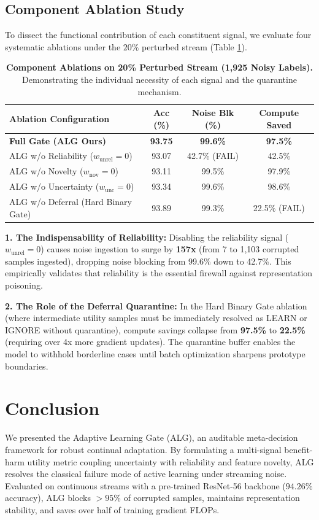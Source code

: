 \documentclass[journal,10pt,twocolumn]{article}
\begin{document}
\subsection{Component Ablation Study}
To dissect the functional contribution of each constituent signal, we evaluate four systematic ablations under the $20\%$ perturbed stream (Table \ref{tab:ablation_table}).

\begin{table}[h]
\centering
\small
\caption{\textbf{Component Ablations on 20\% Perturbed Stream (1,925 Noisy Labels).} Demonstrating the individual necessity of each signal and the quarantine mechanism.}
\label{tab:ablation_table}
\begin{tabular}{l|c|c|c}
\toprule
\textbf{Ablation Configuration} & \textbf{Acc (\%)} & \textbf{Noise Blk (\%)} & \textbf{Compute Saved} \\
\midrule
\textbf{Full Gate (ALG Ours)} & \textbf{93.75} & \textbf{99.6\%} & \textbf{97.5\%} \\
ALG w/o Reliability ($w_{\text{unrel}}=0$) & 93.07 & 42.7\% (FAIL) & 42.5\% \\
ALG w/o Novelty ($w_{\text{nov}}=0$) & 93.11 & 99.5\% & 97.9\% \\
ALG w/o Uncertainty ($w_{\text{unc}}=0$) & 93.34 & 99.6\% & 98.6\% \\
ALG w/o Deferral (Hard Binary Gate) & 93.89 & 99.3\% & 22.5\% (FAIL) \\
\bottomrule
\end{tabular}
\end{table}

\textbf{1. The Indispensability of Reliability:} Disabling the reliability signal ($w_{\text{unrel}} = 0$) causes noise ingestion to surge by \textbf{157x} (from 7 to 1,103 corrupted samples ingested), dropping noise blocking from 99.6\% down to 42.7\%. This empirically validates that reliability is the essential firewall against representation poisoning.

\textbf{2. The Role of the Deferral Quarantine:} In the Hard Binary Gate ablation (where intermediate utility samples must be immediately resolved as LEARN or IGNORE without quarantine), compute savings collapse from \textbf{97.5\%} to \textbf{22.5\%} (requiring over 4x more gradient updates). The quarantine buffer enables the model to withhold borderline cases until batch optimization sharpens prototype boundaries.

\section{Conclusion}
We presented the Adaptive Learning Gate (ALG), an auditable meta-decision framework for robust continual adaptation. By formulating a multi-signal benefit-harm utility metric coupling uncertainty with reliability and feature novelty, ALG resolves the classical failure mode of active learning under streaming noise. Evaluated on continuous streams with a pre-trained ResNet-56 backbone ($94.26\%$ accuracy), ALG blocks $>95\%$ of corrupted samples, maintains representation stability, and saves over half of training gradient FLOPs.
\end{document}

